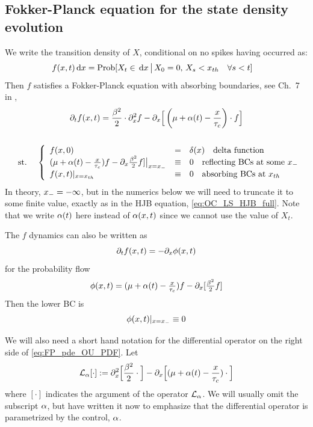 \documentclass[12pt]{iopart}
\begin{document}
\subsection{Fokker-Planck equation for the state density evolution}
We write the transition density of $X$, conditional on no
spikes having occurred as:
\begin{align*}
f(x,t) \, \mathrm{d} x &= \operatorname{Prob}[X_t\in \, \mathrm{d} x \,\big|\, X_0 = 0,\, X_{s} < { x_{th} } \quad
\forall s < t]
\end{align*}
Then $f$ satisfies a Fokker-Planck equation with absorbing boundaries,
see Ch.\ 7 in \cite{Jacobs},
\begin{equation}
\begin{gathered}
{\partial}_t f(x,t) =
				\frac{{\beta}^2 }{2}\cdot {\partial}^2_x f -
				{\partial}_x \Big[ \left( {\mu } + {\alpha}(t)- \frac{x}{{ \tau_{c} }}\right)  \cdot f \Big]
\\
\\
\begin{array}{lll}
	&\textrm{st.\ }&
	\left\{ \begin{array}{lcl}
	 f(x,0) &=& \delta(x) \quad \textrm{delta function}
	\\
	({\mu } + {\alpha}(t)- \tfrac x {{ \tau_{c} }})f - {\partial}_x \tfrac {{\beta}^2}2 f] \big|_{x={ x_{-} }} &\equiv&
	0 \quad \textrm{reflecting BCs at some } { x_{-} }
	\\
	f(x,t) |_{x={ x_{th} }} &\equiv& 0 \quad \textrm{absorbing BCs at } { x_{th} }
\end{array} \right.
\end{array}
\label{eq:FP_pde_OU_PDF}
\end{gathered}
\end{equation}
In theory, ${ x_{-} } = -\infty$, but in the numerics below we will need to
truncate it to some finite value, exactly as in the HJB equation,
\cref{eq:OC_LS_HJB_full}.
Note that we write ${\alpha}(t)$ here instead of ${\alpha}(x,t)$ since we cannot use the
value of $X_t$.

The $f$ dynamics can also be written as
$$
{\partial}_t f(x,t) = - {\partial}_x \phi(x,t)
$$
for the probability flow
$$
\phi(x,t) = ({\mu } + {\alpha}(t) - \tfrac x {{ \tau_{c} }})f - {\partial}_x [\tfrac {{\beta}^2}2 f]
$$
Then the lower BC is
$$
\phi(x,t) |_{x={ x_{-} }} \equiv 0
$$

We will also need a short hand notation for the differential operator on the
right side of \cref{eq:FP_pde_OU_PDF}. Let
$$ { \mathcal{L} }_{\alpha}[\cdot] := {\partial}^2_x \Big[\frac{{\beta}^2 }{2} \cdot\Big] -
 {\partial}_x \Big[ ({\mu } + {\alpha}(t)- \frac{x}{{ \tau_{c} }}) \cdot \Big] $$where
 $[\cdot]$ indicates the argument of the operator ${ \mathcal{L} }_{\alpha}$. We will usually
 omit the subscript ${\alpha}$, but have written it now to emphasize that the
 differential operator is parametrized by the control, ${\alpha}$.
\end{document}

